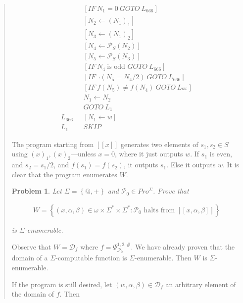 \documentclass[a4paper, 12pt]{article}
\newtheorem{problem}{Problem}
\newtheorem{problem}{Problem}
\begin{document}
\begin{quote}
\begin{align*}
    &[IF ~ N_1 = 0 ~ GOTO ~ L_{666}]\\
    &[N_2 \leftarrow (N_1)_1] \\
    &[N_3 \leftarrow (N_1)_2] \\
    &[N_4 \leftarrow \mathcal{P}_S(N_2)] \\ 
    &[N_5 \leftarrow \mathcal{P}_S(N_3)] \\ 
    &[IF ~ N_4 ~ \text{is odd } GOTO ~ L_{666}] \\ 
    &[IF \neg(N_5 = N_4 / 2) ~ GOTO ~ L_{666} ] \\ 
    &[IF ~ f(N_5) \neq f(N_4) ~ GOTO ~ L_^{666}] \\ 
    &N_1 \leftarrow N_2 \\ 
    &GOTO ~ L_1 \\ 
    L_{666} ~ ~ ~ &[N_1 \leftarrow  w] \\ 
    L_1 ~ ~ ~ &SKIP
\end{align*}

The program starting from $[\![ x ]\!]$ generates two elements of $s_1, s_2 \in S$ using
$(x)_1, (x)_2$---unless $x = 0$, where it just outputs $w$. If $s_1$ is even,
and $s_2 = s_1 / 2$, and $f\left( s_1 \right) = f( s_2 ) $, it outputs $s_1$.
Else it outputs $w$. It is clear that the program enumerates $W$.

\begin{problem}
    Let $\Sigma = \left\{ @, + \right\} $ and $\mathcal{P}_0 \in Pro^{\Sigma}$.
    Prove that 

    \begin{align*}
        W = \left\{ (x, \alpha, \beta) \in \omega \times \Sigma^{*}\times \Sigma^{*}
        : \mathcal{P}_0 \text{ halts from } [\![ x, \alpha, \beta ]\!]\right\} 
    \end{align*}

    is $\Sigma$-enumerable.
\end{problem}

Observe that $W = \mathcal{D}_f$ where $f = \Psi_{\mathcal{P}_0}^{1, 2, \#}$. We
have already proven that the domain of a $\Sigma$-computable function is
$\Sigma$-enumerable. Then $W$ is $\Sigma$-enumerable.  

If the program is still desired, let $(w, \alpha, \beta) \in \mathcal{D}_f$ an
arbitrary element of the domain of $f$. Then


\end{quote}
\end{document}
